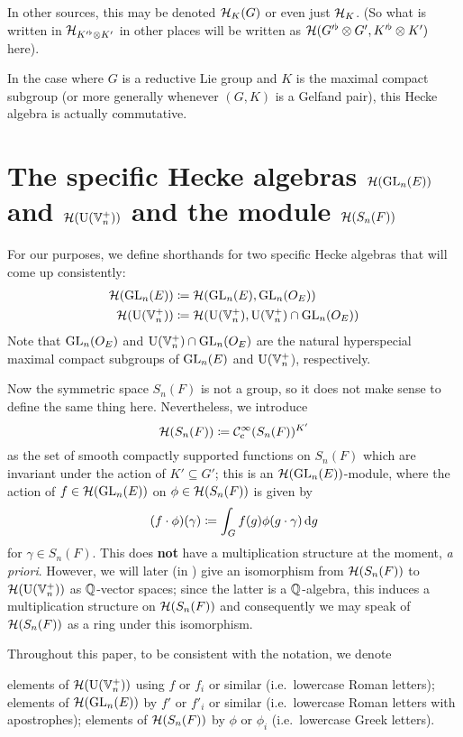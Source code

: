 In other sources, this may be denoted $\mathcal H_K(G)$ or even just $\mathcal H_K$.
(So what is written in $\mathcal H_{K'^\flat \otimes K'}$ in other places
will be written as $\mathcal H(G'^\flat \otimes G', K'^\flat \otimes K')$ here).

In the case where $G$ is a reductive Lie group and
$K$ is the maximal compact subgroup
(or more generally whenever $(G,K)$ is a Gelfand pair),
this Hecke algebra is actually commutative.

\section{The specific Hecke algebras $\mathcal H(\operatorname{GL}_n(E))$ and $\mathcal H(\operatorname{U}(\mathbb V_n^+))$ and the module $\mathcal H(S_n(F))$}
For our purposes, we define shorthands for two specific Hecke algebras
that will come up consistently:
\begin{align*}
  \mathcal H(\operatorname{GL}_n(E)) &\coloneqq \mathcal H(\operatorname{GL}_n(E), \operatorname{GL}_n(O_E)) \\
  \mathcal H(\operatorname{U}(\mathbb V_n^+)) &\coloneqq \mathcal H(\operatorname{U}(\mathbb V_n^+), \operatorname{U}(\mathbb V_n^+) \cap \operatorname{GL}_n(O_E))
\end{align*}
Note that $\operatorname{GL}_n(O_E)$ and $\operatorname{U}(\mathbb V_n^+) \cap \operatorname{GL}_n(O_E)$
are the natural hyperspecial maximal compact subgroups of $\operatorname{GL}_n(E)$ and $\operatorname{U}(\mathbb V_n^+$),
respectively.

Now the symmetric space $S_n(F)$ is not a group,
so it does not make sense to define the same thing here.
Nevertheless, we introduce
\[ \mathcal H(S_n(F)) \coloneqq \mathcal C_{\mathrm{c}}^{\infty}(S_n(F))^{K'} \]
as the set of smooth compactly supported functions on $S_n(F)$
which are invariant under the action of $K' \subseteq G'$;
this is an $\mathcal H(\operatorname{GL}_n(E))$-module,
where the action of $f \in \mathcal H(\operatorname{GL}_n(E))$ on $\phi \in \mathcal H(S_n(F))$ is given by
\[ (f \cdot \phi)(\gamma) \coloneqq \int_G f(g) \phi(g \cdot \gamma) \odif g \]
for $\gamma \in S_n(F)$.
This does \textbf{not} have a multiplication structure at the moment, \emph{a priori}.
However, we will later (in ) give an isomorphism from $\mathcal H(S_n(F))$
to $\mathcal H(\operatorname{U}(\mathbb V_n^+))$ as $\mathbb Q$-vector spaces;
since the latter is a $\mathbb Q$-algebra,
this induces a multiplication structure on $\mathcal H(S_n(F))$
and consequently we may speak of $\mathcal H(S_n(F))$ as a ring under this isomorphism.

Throughout this paper, to be consistent with the notation, we denote
\begin{itemize}
  \ii elements of $\mathcal H(\operatorname{U}(\mathbb V_n^+))$ using $f$ or $f_i$ or similar
    (i.e.\ lowercase Roman letters);
  \ii elements of $\mathcal H(\operatorname{GL}_n(E))$ by $f'$ or $f'_i$ or similar
    (i.e.\ lowercase Roman letters with apostrophes);
  \ii elements of $\mathcal H(S_n(F))$ by $\phi$ or $\phi_i$
    (i.e.\ lowercase Greek letters).
\end{itemize}
